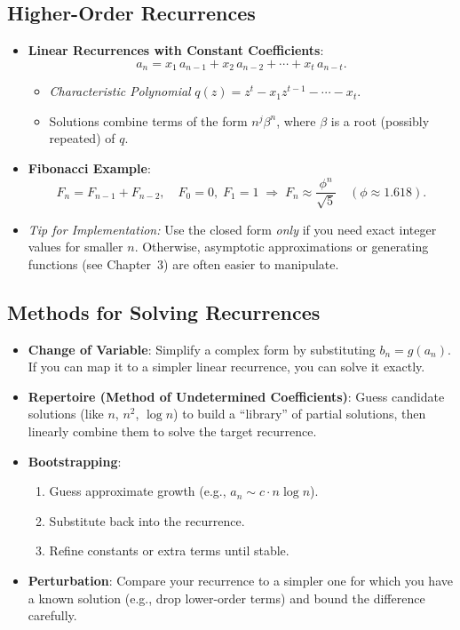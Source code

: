 \documentclass[11pt,letterpaper]{article}
\begin{document}
\subsection{Higher-Order Recurrences}
\begin{itemize}
  \item \textbf{Linear Recurrences with Constant Coefficients}: 
    \[
      a_n = x_1\,a_{n-1} + x_2\,a_{n-2} + \cdots + x_t\,a_{n-t}.
    \]
    \begin{itemize}
      \item \emph{Characteristic Polynomial} \(q(z) = z^t - x_1 z^{t-1} - \cdots - x_t.\)
      \item Solutions combine terms of the form \(n^j \beta^n\), where \(\beta\) is a root (possibly repeated) of \(q\).
    \end{itemize}
  \item \textbf{Fibonacci Example}:
    \[
      F_n = F_{n-1} + F_{n-2},\quad F_0=0,\;F_1=1
      \;\Longrightarrow\;
      F_n \approx \frac{\phi^n}{\sqrt{5}}\quad(\phi\approx 1.618).
    \]
  \item \emph{Tip for Implementation:} Use the closed form \emph{only} if you need exact integer values for smaller \(n\). Otherwise, asymptotic approximations or generating functions (see Chapter~3) are often easier to manipulate.
\end{itemize}

\subsection{Methods for Solving Recurrences}
\begin{itemize}
  \item \textbf{Change of Variable}: Simplify a complex form by substituting \(b_n = g(a_n)\). If you can map it to a simpler linear recurrence, you can solve it exactly.
  \item \textbf{Repertoire (Method of Undetermined Coefficients)}: Guess candidate solutions (like \(n\), \(n^2\), \(\log n\)) to build a “library” of partial solutions, then linearly combine them to solve the target recurrence.
  \item \textbf{Bootstrapping}:
    \begin{enumerate}
      \item Guess approximate growth (e.g., \(a_n \sim c \cdot n \log n\)).
      \item Substitute back into the recurrence.
      \item Refine constants or extra terms until stable.
    \end{enumerate}
  \item \textbf{Perturbation}: Compare your recurrence to a simpler one for which you have a known solution (e.g., drop lower-order terms) and bound the difference carefully.
\end{itemize}
\end{document}

